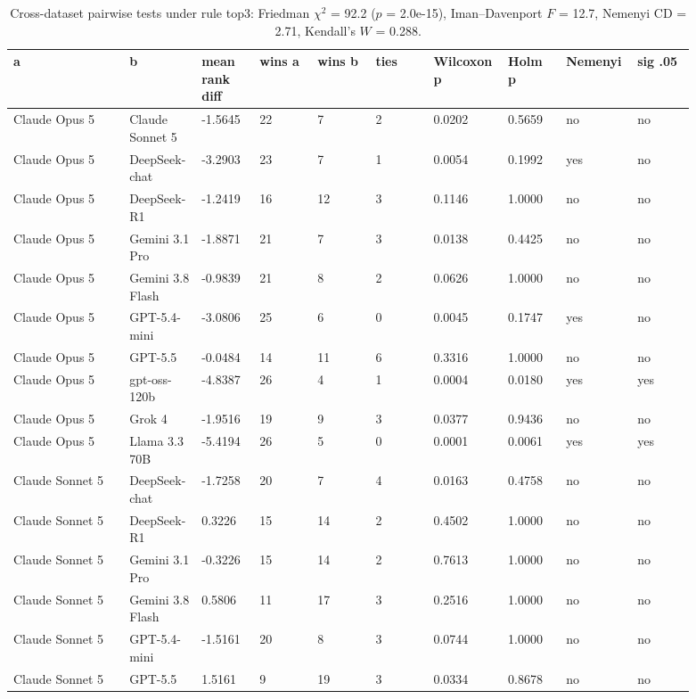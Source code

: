 \begin{landscape}
\tiny
\setlength{\tabcolsep}{3pt}
\begin{longtable}{p{0.162\linewidth}p{0.081\linewidth}p{0.081\linewidth}p{0.081\linewidth}p{0.081\linewidth}p{0.081\linewidth}p{0.081\linewidth}p{0.081\linewidth}p{0.081\linewidth}p{0.081\linewidth}}
\caption{Cross-dataset pairwise tests under rule top3: Friedman $\chi^2$ = 92.2 ($p$ = 2.0e-15), Iman--Davenport $F$ = 12.7, Nemenyi CD = 2.71, Kendall's $W$ = 0.288.}\label{tab:pairwise_top3}\\
\toprule
a & b & mean rank diff & wins a & wins b & ties & Wilcoxon p & Holm p & Nemenyi & sig .05 \\
\midrule
Claude Opus 5 & Claude Sonnet 5 & -1.5645 & 22 & 7 & 2 & 0.0202 & 0.5659 & no & no \\
Claude Opus 5 & DeepSeek-chat & -3.2903 & 23 & 7 & 1 & 0.0054 & 0.1992 & yes & no \\
Claude Opus 5 & DeepSeek-R1 & -1.2419 & 16 & 12 & 3 & 0.1146 & 1.0000 & no & no \\
Claude Opus 5 & Gemini 3.1 Pro & -1.8871 & 21 & 7 & 3 & 0.0138 & 0.4425 & no & no \\
Claude Opus 5 & Gemini 3.8 Flash & -0.9839 & 21 & 8 & 2 & 0.0626 & 1.0000 & no & no \\
Claude Opus 5 & GPT-5.4-mini & -3.0806 & 25 & 6 & 0 & 0.0045 & 0.1747 & yes & no \\
Claude Opus 5 & GPT-5.5 & -0.0484 & 14 & 11 & 6 & 0.3316 & 1.0000 & no & no \\
Claude Opus 5 & gpt-oss-120b & -4.8387 & 26 & 4 & 1 & 0.0004 & 0.0180 & yes & yes \\
Claude Opus 5 & Grok 4 & -1.9516 & 19 & 9 & 3 & 0.0377 & 0.9436 & no & no \\
Claude Opus 5 & Llama 3.3 70B & -5.4194 & 26 & 5 & 0 & 0.0001 & 0.0061 & yes & yes \\
Claude Sonnet 5 & DeepSeek-chat & -1.7258 & 20 & 7 & 4 & 0.0163 & 0.4758 & no & no \\
Claude Sonnet 5 & DeepSeek-R1 & 0.3226 & 15 & 14 & 2 & 0.4502 & 1.0000 & no & no \\
Claude Sonnet 5 & Gemini 3.1 Pro & -0.3226 & 15 & 14 & 2 & 0.7613 & 1.0000 & no & no \\
Claude Sonnet 5 & Gemini 3.8 Flash & 0.5806 & 11 & 17 & 3 & 0.2516 & 1.0000 & no & no \\
Claude Sonnet 5 & GPT-5.4-mini & -1.5161 & 20 & 8 & 3 & 0.0744 & 1.0000 & no & no \\
Claude Sonnet 5 & GPT-5.5 & 1.5161 & 9 & 19 & 3 & 0.0334 & 0.8678 & no & no \\

\end{longtable}
\end{landscape}
